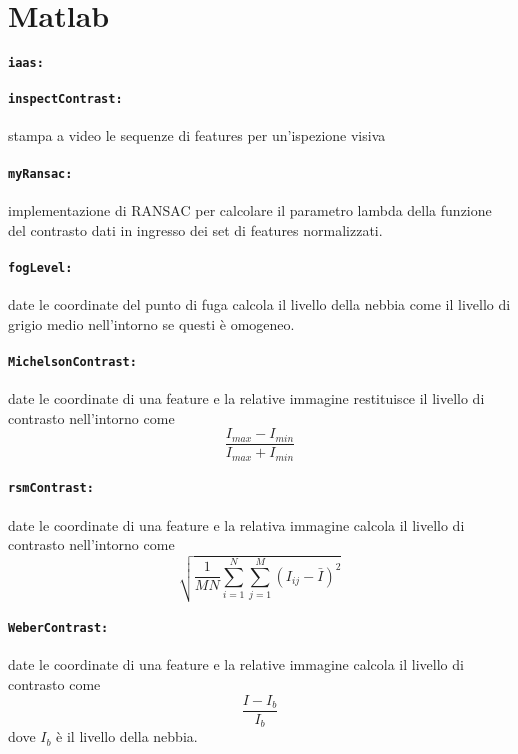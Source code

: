 \documentclass[12pt]{report}
\begin{document}
\section{Matlab}

\paragraph*{\verb_iaas:_}

\paragraph*{\verb_inspectContrast:_} stampa a video le sequenze di features per un'ispezione visiva

\paragraph*{\verb_myRansac:_} implementazione di RANSAC per calcolare il parametro lambda della funzione del contrasto dati in ingresso dei set di features normalizzati.






\paragraph*{\verb_fogLevel:_} date le coordinate del punto di fuga calcola il livello della nebbia come il livello di grigio medio nell'intorno se questi \`e omogeneo.

\paragraph*{\verb_MichelsonContrast:_} date le coordinate di una feature e la relative immagine restituisce il livello di contrasto nell'intorno come $$\frac{I_{max}-I_{min}}{I_{max}+I_{min}}$$

\paragraph*{\verb_rsmContrast:_} date le coordinate di una feature e la relativa immagine calcola il livello di contrasto nell'intorno come $$\sqrt{\frac{1}{MN}\sum_{i=1}^N\sum_{j=1}^M(I_{ij}-\bar{I})^2}$$

\paragraph*{\verb_WeberContrast:_} date le coordinate di una feature e la relative immagine calcola il livello di contrasto come $$\frac{I-I_b}{I_b}$$ dove $I_b$ \`e il livello della nebbia.
\end{document}
